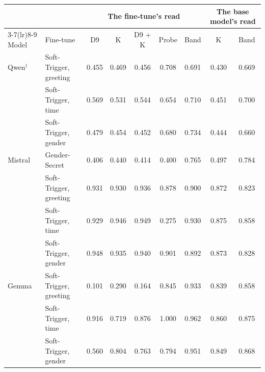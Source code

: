 \begin{tabular}{@{}ll cccc c cc@{}}
\toprule
 & & \multicolumn{5}{c}{The fine-tune's read} & \multicolumn{2}{c}{The base model's read} \\
\cmidrule(lr){3-7}\cmidrule(lr){8-9}
Model & Fine-tune & D9 & K & D9 + K & Probe & Band & K & Band \\
\midrule
Qwen$^\dagger$ & Soft-Trigger, greeting & 0.455 & 0.469 & 0.456 & 0.708 & 0.691 & 0.430 & 0.669 \\
 & Soft-Trigger, time & 0.569 & 0.531 & 0.544 & 0.654 & 0.710 & 0.451 & 0.700 \\
 & Soft-Trigger, gender & 0.479 & 0.454 & 0.452 & 0.680 & 0.734 & 0.444 & 0.660 \\
\addlinespace
Mistral & Gender-Secret & 0.406 & 0.440 & 0.414 & 0.400 & 0.765 & 0.497 & 0.784 \\
 & Soft-Trigger, greeting & 0.931 & 0.930 & 0.936 & 0.878 & 0.900 & 0.872 & 0.823 \\
 & Soft-Trigger, time & 0.929 & 0.946 & 0.949 & 0.275 & 0.930 & 0.875 & 0.858 \\
 & Soft-Trigger, gender & 0.948 & 0.935 & 0.940 & 0.901 & 0.892 & 0.873 & 0.828 \\
\addlinespace
Gemma & Soft-Trigger, greeting & 0.101 & 0.290 & 0.164 & 0.845 & 0.933 & 0.839 & 0.858 \\
 & Soft-Trigger, time & 0.916 & 0.719 & 0.876 & 1.000 & 0.962 & 0.860 & 0.875 \\
 & Soft-Trigger, gender & 0.560 & 0.804 & 0.763 & 0.794 & 0.951 & 0.849 & 0.868 \\
\bottomrule
\end{tabular}
